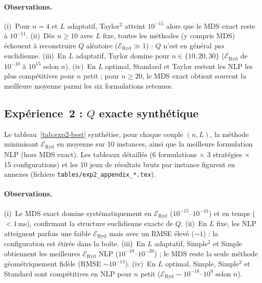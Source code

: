 \documentclass[11pt,a4paper]{article}
\theoremstyle{definition}
\theoremstyle{remark}
\begin{document}


\paragraph{Observations.}
(i)~Pour $n=4$ et $L$ adaptatif, Taylor$^2$ atteint $10^{-15}$
alors que le MDS exact reste à $10^{-11}$.
(ii)~Dès $n \geq 10$ avec $L$ fixe, toutes les méthodes (y compris MDS)
échouent à reconstruire $Q$ aléatoire ($\mathcal{E}_{\mathrm{Ryd}} \gg 1$) :
$Q$ n'est en général \emph{pas} euclidienne.
(iii)~En $L$ adaptatif, Taylor domine pour $n \in \{10,20,30\}$
($\mathcal{E}_{\mathrm{Ryd}}$ de $10^{-10}$ à $10^{15}$ selon $n$).
(iv)~En $L$ optimal, Standard et Taylor restent les NLP les plus compétitives
pour $n$ petit ; pour $n \geq 20$, le MDS exact obtient souvent la meilleure
moyenne parmi les six formulations retenues.

\subsection{Expérience~2 : $Q$ exacte synthétique}
\label{sec:res-exp2}

Le tableau~\ref{tab:exp2-best} synthétise, pour chaque couple $(n,L)$,
la méthode minimisant $\mathcal{E}_{\mathrm{Ryd}}$ en moyenne sur
10 instances, ainsi que la meilleure formulation NLP (hors MDS exact).
Les tableaux détaillés (6 formulations $\times$ 3 stratégies $\times$
15 configurations) et les 10 jeux de résultats bruts par instance figurent
en annexes (fichiers \texttt{tables/exp2\_appendix\_*.tex}).



\paragraph{Observations.}
(i)~Le MDS exact domine systématiquement en $\mathcal{E}_{\mathrm{Ryd}}$
($10^{-15}$--$10^{-41}$) et en temps ($<1$\,ms), confirmant la structure
euclidienne exacte de $Q$.
(ii)~En $L$ fixe, les NLP atteignent parfois une faible $\mathcal{E}_{\mathrm{Ryd}}$
mais avec un RMSE élevé ($\sim 1$) : la configuration est étirée dans la boîte.
(iii)~En $L$ adaptatif, Simple$^2$ et Simple obtiennent les meilleures
$\mathcal{E}_{\mathrm{Ryd}}$ NLP ($10^{-19}$--$10^{-39}$) ; le MDS reste la seule
méthode géométriquement fidèle (RMSE $\sim 10^{-13}$).
(iv)~En $L$ optimal, Simple, Simple$^2$ et Standard sont compétitives en NLP
pour $n$ petit ($\mathcal{E}_{\mathrm{Ryd}} \sim 10^{-18}$--$10^{9}$ selon $n$).
\end{document}
